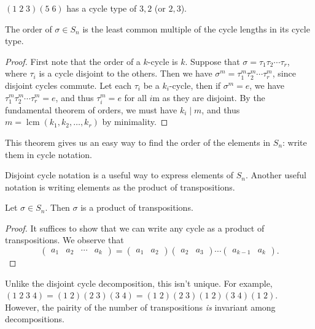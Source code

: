 \documentclass[a4paper]{scrartcl}
\begin{document}
\begin{example}
	$(1\; 2\; 3)(5\; 6)$ has a cycle type of $3, 2$ (or $2, 3$).
\end{example}

\begin{theorem}
	The order of $\sigma \in S_n$ is the least common multiple of the cycle lengths in its cycle type.
\end{theorem}
\begin{proof}
	First note that the order of a $k$-cycle is $k$. Suppose that $\sigma = \tau_1 \tau_2 \cdots \tau_r$, where $\tau_i$ is a cycle disjoint to the others. Then we have $\sigma^m = \tau_1^m \tau_2^m \cdots \tau_r^m$, since disjoint cycles commute. Let each $\tau_i$ be a $k_i$-cycle, then if $\sigma^m = e$, we have $\tau_1^m \tau_2^m \cdots \tau_r^m = e$, and thus $\tau_i^m = e$ for all $i$m as they are disjoint. By the fundamental theorem of orders, we must have $k_i \mid m$, and thus $m = \operatorname{lcm}(k_1, k_2, \dots, k_r)$ by minimality.
\end{proof}

This theorem gives us an easy way to find the order of the elements in $S_n$: write them in cycle notation.

Disjoint cycle notation is a useful way to express elements of $S_n$. Another useful notation is writing elements as the product of transpositions.

\begin{theorem}
	Let $\sigma \in S_n$. Then $\sigma$ is a product of transpositions.
\end{theorem}
\begin{proof}
	It suffices to show that we can write any cycle as a product of transpositions. We observe that
	$$
	\begin{pmatrix} a_1 & a_2 & \cdots & a_k \end{pmatrix} = \begin{pmatrix} a_1 & a_2 \end{pmatrix}  \begin{pmatrix} a_2 & a_3 \end{pmatrix} \cdots  \begin{pmatrix} a_{k - 1} & a_k \end{pmatrix}.
	$$
\end{proof}

Unlike the disjoint cycle decomposition, this isn't unique. For example, $(1\; 2\; 3\; 4) = (1\; 2)(2\; 3)(3\; 4) = (1\; 2) (2\; 3)(1\; 2)(3\; 4)(1\; 2)$. However, the pairity of the number of transpositions \emph{is} invariant among decompositions.
\end{document}
